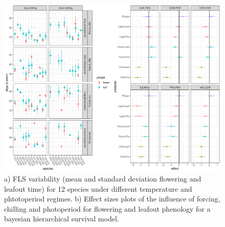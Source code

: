 \documentclass{article}\usepackage[]{graphicx}\usepackage[]{color}
\begin{document}
\begin{center}
\begin{figure}[here]
\includegraphics[width=16 cm]{..//figures/Quals_plots.pdf}
\caption{a) FLS variability (mean and standard deviation flowering and leafout time) for 12 species under different temperature and phtotoperiod regimes. b) Effect sizes plots of the influence of forcing, chilling and photoperiod for flowering and leafout phenology for a bayesian hierarchical survival model.}
\label{fig:Figure 4}
\end{figure}
\end{center}
%
%
\end{document}
